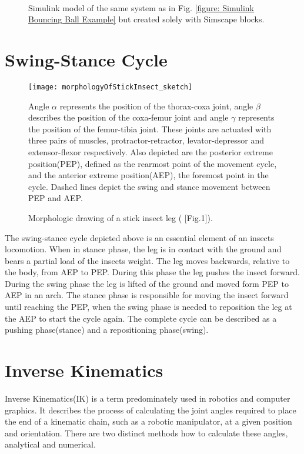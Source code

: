 \begin{figure}[h]
	\centering
	\centerline{}
	\
	\caption{Simulink model of the same system as in Fig. \ref{figure: Simulink Bouncing Ball Example} but created solely with Simscape blocks.}
	\label{figure: Simscape Bouncing Ball Example}
\end{figure}

\section{Swing-Stance Cycle}

\begin{figure}[h]
	\centerline{\texttt{[image: morphologyOfStickInsect\_sketch]}}
	\caption{Morphologic drawing of a stick insect leg (\cite{schilling2013walknet} [Fig.1]).}
	\begin{footnotesize}
		Angle $\alpha$ represents the position of the thorax-coxa joint, angle $\beta$ describes the position of the coxa-femur joint and angle $\gamma$ represents the position of the femur-tibia joint.
		These joints are actuated with three pairs of muscles, protractor-retractor, levator-depressor and extensor-flexor respectively.
		Also depicted are the posterior extreme position(PEP), defined as the rearmost point of the movement cycle, and the anterior extreme position(AEP), the foremost point in the cycle.
		Dashed lines depict the swing and stance movement between PEP and AEP.
	\end{footnotesize}
	
	\label{figure: Stick insect leg}
\end{figure}

The swing-stance cycle depicted above is an essential element of an insects locomotion.
When in stance phase, the leg is in contact with the ground and bears a partial load of the insects weight.
The leg moves backwards, relative to the body, from AEP to PEP. During this phase the leg pushes the insect forward.
During the swing phase the leg is lifted of the ground and moved form PEP to AEP in an arch.
The stance phase is responsible for moving the insect forward until reaching the PEP, when the swing phase is needed to reposition the leg at the AEP to start the cycle again.
The complete cycle can be described as a pushing phase(stance) and a repositioning phase(swing).



\section{Inverse Kinematics}
Inverse Kinematics(IK) is a term predominately used in robotics and computer graphics.
It describes the process of calculating the joint angles required to place the end of a kinematic chain, such as a robotic manipulator, at a given position and orientation.
There are two distinct methods how to calculate these angles, analytical and numerical.

